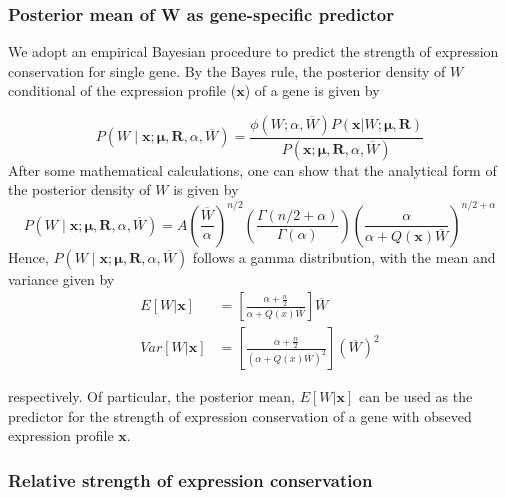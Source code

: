 \documentclass[]{book}
\begin{document}
\hypertarget{posterior-mean-of-w-as-gene-specific-predictor}{%
\subsubsection{Posterior mean of W as gene-specific predictor}\label{posterior-mean-of-w-as-gene-specific-predictor}}

We adopt an empirical Bayesian procedure to predict the strength of expression conservation for single gene. By the Bayes rule, the posterior density of \(W\) conditional of the expression profile (\(\boldsymbol{x}\)) of a gene is given by

\[P\left(W \mid \boldsymbol{x};\boldsymbol{\mu},\boldsymbol{R},\alpha,\overline{W} \right) =\frac{\phi\left(W;\alpha,\overline{W}\right)P\left(\boldsymbol{x}|W;\boldsymbol{\mu},\boldsymbol{R}\right)}{P\left(\boldsymbol{x};\boldsymbol{\mu},\boldsymbol{R},\alpha,\overline{W}\right)}\tag{3.7}\]
After some mathematical calculations, one can show that the analytical form of the posterior density of \(W\) is given by
\[P\left(W \mid \boldsymbol{x};\boldsymbol{\mu},\boldsymbol{R},\alpha,\overline{W} \right) = A\left(\frac{\overline{W}}{\alpha}\right)^{n/2}\left(\frac{\Gamma\left(n/2+\alpha\right)}{\Gamma\left(\alpha\right)}\right)\left(\frac{\alpha}{\alpha+Q\left(\boldsymbol{x}\right)\overline{W}}\right)^{n/2+\alpha}\tag{3.8}\]
Hence, \(P\left(W \mid \boldsymbol{x};\boldsymbol{\mu},\boldsymbol{R},\alpha,\overline{W} \right)\) follows a gamma distribution, with the mean and variance given by
\[
\begin{split}
E\left[W|\boldsymbol{x}\right]\  &=\left[\frac{\alpha+\frac{n}{2}}{\alpha+Q\left(x\right)\overline{W}}\right]\overline{W}\\
Var\left[W|\boldsymbol{x}\right]&=\left[\frac{\alpha+\frac{n}{2}}{\left(\alpha+Q\left(x\right)\overline{W}\right)^2}\right](\overline{W})^2
\end{split}\tag{3.9}
\]

respectively. Of particular, the posterior mean, \(E\left[W|\boldsymbol{x}\right]\) can be used as the predictor for the strength of expression conservation of a gene with obseved expression profile \(\boldsymbol{x}\).

\hypertarget{relative-strength-of-expression-conservation}{%
\subsubsection{Relative strength of expression conservation}\label{relative-strength-of-expression-conservation}}
\end{document}
